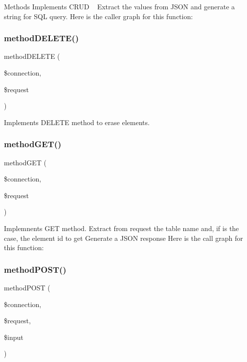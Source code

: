 Methods Implements C\+R\+UD ~\newline
Extract the values from J\+S\+ON and generate a string for S\+QL query. Here is the caller graph for this function\+:
\mbox{\label{crud_method_8php_ae6cadce380cfc217059b21886e8b875b}} 
\subsubsection{\texorpdfstring{method\+D\+E\+L\+E\+T\+E()}{methodDELETE()}}
{\footnotesize\ttfamily method\+D\+E\+L\+E\+TE (\begin{DoxyParamCaption}\item[{}]{\$connection,  }\item[{}]{\$request }\end{DoxyParamCaption})}

Implements D\+E\+L\+E\+TE method to erase elements. \mbox{\label{crud_method_8php_a3f8c85af09dddef6e14bd0ea75401d8d}} 
\subsubsection{\texorpdfstring{method\+G\+E\+T()}{methodGET()}}
{\footnotesize\ttfamily method\+G\+ET (\begin{DoxyParamCaption}\item[{}]{\$connection,  }\item[{}]{\$request }\end{DoxyParamCaption})}

Implemnents G\+ET method. Extract from request the table name and, if is the case, the element id to get Generate a J\+S\+ON response Here is the call graph for this function\+:
\mbox{\label{crud_method_8php_a558300dda434f376241f7d70a2595ee5}} 
\subsubsection{\texorpdfstring{method\+P\+O\+S\+T()}{methodPOST()}}
{\footnotesize\ttfamily method\+P\+O\+ST (\begin{DoxyParamCaption}\item[{}]{\$connection,  }\item[{}]{\$request,  }\item[{}]{\$input }\end{DoxyParamCaption})}

